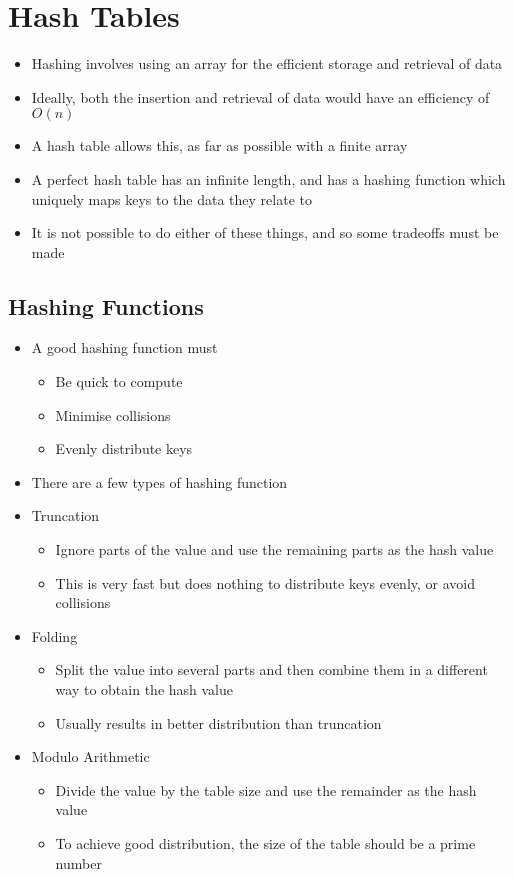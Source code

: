 
\section*{Hash Tables}

\begin{itemize}
  \item Hashing involves using an array for the efficient storage and retrieval of data
  \item Ideally, both the insertion and retrieval of data would have an efficiency of $O(n)$
  \item A hash table allows this, as far as possible with a finite array
  \item A perfect hash table has an infinite length, and has a hashing function which uniquely maps keys to the data they relate to
  \item It is not possible to do either of these things, and so some tradeoffs must be made
\end{itemize}

\subsection*{Hashing Functions}

\begin{itemize}
  \item A good hashing function must
  \begin{itemize}
    \item Be quick to compute
    \item Minimise collisions
    \item Evenly distribute keys
  \end{itemize}
  \item There are a few types of hashing function
  \item Truncation
  \begin{itemize}
    \item Ignore parts of the value and use the remaining parts as the hash value
    \item This is very fast but does nothing to distribute keys evenly, or avoid collisions
  \end{itemize}
  \item Folding
  \begin{itemize}
    \item Split the value into several parts and then combine them in a different way to obtain the hash value
    \item Usually results in better distribution than truncation
  \end{itemize}
  \item Modulo Arithmetic
  \begin{itemize}
    \item Divide the value by the table size and use the remainder as the hash value
    \item To achieve good distribution, the size of the table should be a prime number
  \end{itemize}
\end{itemize}

